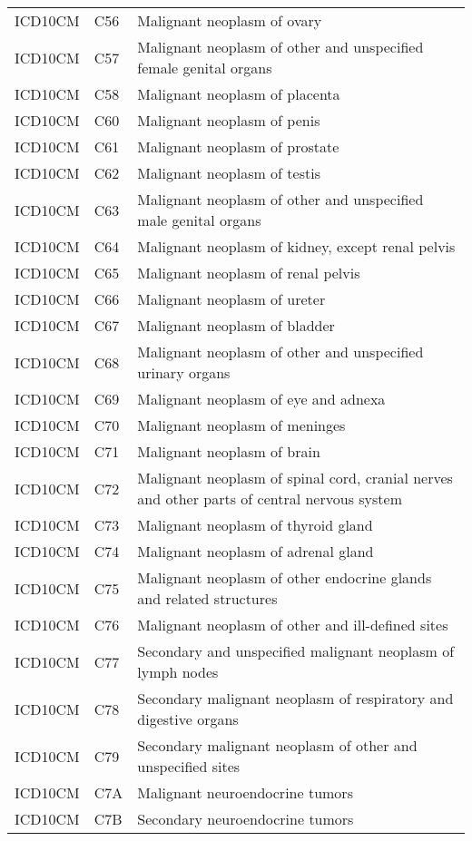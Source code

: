 \begin{table}[ht]
\begin{tabular}{lll}
  ICD10CM & C56 & Malignant neoplasm of ovary \\ 
  ICD10CM & C57 & Malignant neoplasm of other and unspecified female genital organs \\ 
  ICD10CM & C58 & Malignant neoplasm of placenta \\ 
  ICD10CM & C60 & Malignant neoplasm of penis \\ 
  ICD10CM & C61 & Malignant neoplasm of prostate \\ 
  ICD10CM & C62 & Malignant neoplasm of testis \\ 
  ICD10CM & C63 & Malignant neoplasm of other and unspecified male genital organs \\ 
  ICD10CM & C64 & Malignant neoplasm of kidney, except renal pelvis \\ 
  ICD10CM & C65 & Malignant neoplasm of renal pelvis \\ 
  ICD10CM & C66 & Malignant neoplasm of ureter \\ 
  ICD10CM & C67 & Malignant neoplasm of bladder \\ 
  ICD10CM & C68 & Malignant neoplasm of other and unspecified urinary organs \\ 
  ICD10CM & C69 & Malignant neoplasm of eye and adnexa \\ 
  ICD10CM & C70 & Malignant neoplasm of meninges \\ 
  ICD10CM & C71 & Malignant neoplasm of brain \\ 
  ICD10CM & C72 & Malignant neoplasm of spinal cord, cranial nerves and other parts of central nervous system \\ 
  ICD10CM & C73 & Malignant neoplasm of thyroid gland \\ 
  ICD10CM & C74 & Malignant neoplasm of adrenal gland \\ 
  ICD10CM & C75 & Malignant neoplasm of other endocrine glands and related structures \\ 
  ICD10CM & C76 & Malignant neoplasm of other and ill-defined sites \\ 
  ICD10CM & C77 & Secondary and unspecified malignant neoplasm of lymph nodes \\ 
  ICD10CM & C78 & Secondary malignant neoplasm of respiratory and digestive organs \\ 
  ICD10CM & C79 & Secondary malignant neoplasm of other and unspecified sites \\ 
  ICD10CM & C7A & Malignant neuroendocrine tumors \\ 
  ICD10CM & C7B & Secondary neuroendocrine tumors \\ 

\end{tabular}
\end{table}
